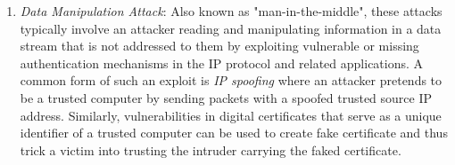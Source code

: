 \begin{enumerate}


\item \textit{Data Manipulation Attack}: Also known as "man-in-the-middle", these attacks typically involve an attacker reading and manipulating information in a data stream that is not addressed to them by exploiting vulnerable or missing authentication mechanisms in the IP protocol and related applications. A common form of such an exploit is \textit{IP spoofing} where an attacker pretends to be a trusted computer by sending packets with a spoofed trusted source IP address. Similarly, vulnerabilities in digital certificates that serve as a unique identifier of a trusted computer can be used to create fake certificate and thus trick a victim into trusting the intruder carrying the faked certificate.







\end{enumerate}
